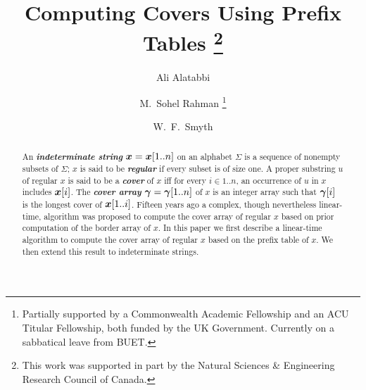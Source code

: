 \documentclass[runningheads,a4paper]{llncs}
\def\s#1{\mbox{\boldmath $#1$}}
\def\itbf#1{\textit{\textbf{#1}}}
\begin{document}
\pagestyle{headings}
\title{Computing Covers Using Prefix Tables
\thanks{This work was supported in part by the Natural Sciences \& Engineering
Research Council of Canada.}
}

 

\author{
Ali Alatabbi
\and 
M.\ Sohel Rahman
\thanks{Partially supported by a Commonwealth Academic Fellowship and
an ACU Titular Fellowship, both funded by the UK Government. Currently
on a sabbatical leave from BUET.}
\and 
W.\ F.\ Smyth
}




\maketitle
\begin{abstract}
An \itbf{indeterminate string}
$\s{x} = \s{x}[1..n]$ on an alphabet $\Sigma$
is a sequence of nonempty subsets of $\Sigma$;
\s{x} is said to be \itbf{regular} if every subset is of size one.
A proper substring \s{u} of regular \s{x} is said to be a \itbf{cover} of \s{x}
iff for every $i \in 1..n$,
an occurrence of \s{u} in \s{x} includes $\s{x}[i]$.
The \itbf{cover array} $\s{\gamma} = \s{\gamma}[1..n]$ of \s{x}
is an integer array such that $\s{\gamma}[i]$ is the longest cover
of $\s{x}[1..i]$.
Fifteen years ago a complex, though nevertheless linear-time, algorithm
was proposed to compute the cover array of regular \s{x}
based on prior computation of the border array of \s{x}.
In this paper we first describe a linear-time algorithm
to compute the cover array of regular \s{x} based on the prefix table of \s{x}.
We then extend this result to indeterminate strings.
\end{abstract}
\end{document}

